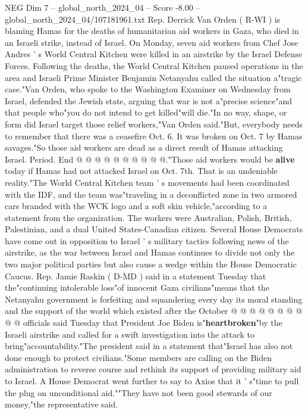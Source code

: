 \begin{textsample}{NEG Dim 7 – global\_north\_2024\_04 – Score -8.00 – global\_north\_2024\_04/107181961.txt}  \label{ex:f7_neg_227}
Rep.
Derrick Van Orden ( R-WI ) is blaming Hamas for the deaths of humanitarian aid workers in Gaza, who died in an Israeli strike, instead of Israel.
On Monday, seven aid workers from Chef Jose Andres ' s World Central Kitchen were killed in an airstrike by the Israel Defense Forces.
Following the deaths, the World Central Kitchen paused operations in the area and Israeli Prime Minister Benjamin Netanyahu called the situation a"tragic case."Van Orden, who spoke to the Washington Examiner on Wednesday from Israel, defended the Jewish state, arguing that war is not a"precise science"and that people who"you do not intend to get killed"will die."In no way, shape, or form did Israel target those relief workers,"Van Orden said."But, everybody needs to remember that there was a ceasefire Oct. 6.
It was broken on Oct. 7 by Hamas savages."So those aid workers are dead as a direct result of Hamas attacking Israel.
Period.
End @ @ @ @ @ @ @ @ @ @."Those aid workers would be \textbf{alive} today if Hamas had not attacked Israel on Oct. 7th.
That is an undeniable reality."The World Central Kitchen team ' s movements had been coordinated with the IDF, and the team was"traveling in a deconflicted zone in two armored cars branded with the WCK logo and a soft skin vehicle,"according to a statement from the organization.
The workers were Australian, Polish, British, Palestinian, and a dual United States-Canadian citizen.
Several House Democrats have come out in opposition to Israel ' s military tactics following news of the airstrike, as the war between Israel and Hamas continues to divide not only the two major political parties but also cause a wedge within the House Democratic Caucus.
Rep.
Jamie Raskin ( D-MD ) said in a statement Tuesday that the"continuing intolerable loss"of innocent Gaza civilians"means that the Netanyahu government is forfeiting and squandering every day its moral standing and the support of the world which existed after the October @ @ @ @ @ @ @ @ @ @ officials said Tuesday that President Joe Biden is"\textbf{heartbroken}"by the Israeli airstrike and called for a swift investigation into the attack to bring"accountability."The president said in a statement that"Israel has also not done enough to protect civilians."Some members are calling on the Biden administration to reverse course and rethink its support of providing military aid to Israel.
A House Democrat went further to say to Axios that it ' s"time to pull the plug on unconditional aid.""They have not been good stewards of our money,"the representative said.

\end{textsample}
